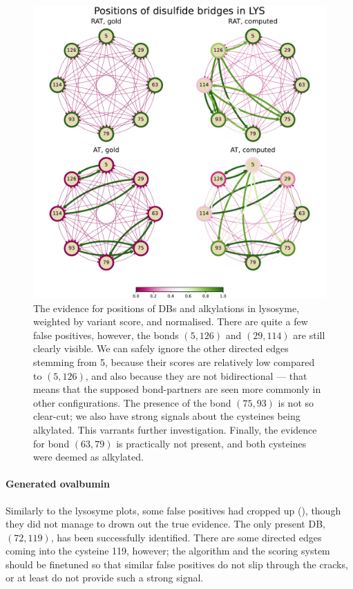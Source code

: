 \begin{figure}
  \centering
  \includegraphics[width=1\linewidth]{img/lys.pdf}
  \caption{The evidence for positions of DBs and alkylations in lysosyme, weighted by variant score, and normalised. There are quite a few false positives, however, the bonds \((5, 126)\) and \((29, 114)\) are still clearly visible. We can safely ignore the other directed edges stemming from 5, because their scores are relatively low compared to \((5, 126)\), and also because they are not bidirectional --- that means that the supposed bond-partners are seen more commonly in other configurations. The presence of the bond \((75, 93)\) is not so clear-cut; we also have strong signals about the cysteines being alkylated. This varrants further investigation. Finally, the evidence for bond \((63, 79)\) is practically not present, and both cysteines were deemed as alkylated.}\label{fig:lys}
\end{figure}

\paragraph{Generated ovalbumin} Similarly to the lysosyme plots, some false positives had cropped up (), though they did not manage to drown out the true evidence. The only present DB, \((72, 119)\), has been successfully identified. There are some directed edges coming into the cysteine 119, however; the algorithm and the scoring system should be finetuned so that similar false positives do not slip through the cracks, or at least do not provide such a strong signal.

